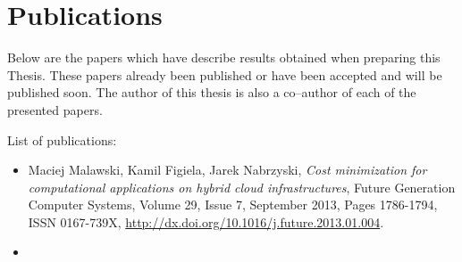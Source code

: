 \chapter{Publications} %

\label{AppendixB}

Below are the papers which have describe results obtained when preparing this Thesis. These papers already been published or have been accepted and will be published soon. The author of this thesis is also a co--author of each of the presented papers.

List of publications:

\begin{itemize}
  \item Maciej Malawski, Kamil Figiela, Jarek Nabrzyski, \emph{Cost minimization for computational applications on hybrid cloud infrastructures}, Future Generation Computer Systems, Volume 29, Issue 7, September 2013, Pages 1786-1794, ISSN 0167-739X, \url{http://dx.doi.org/10.1016/j.future.2013.01.004}.
  \item
\end{itemize}






